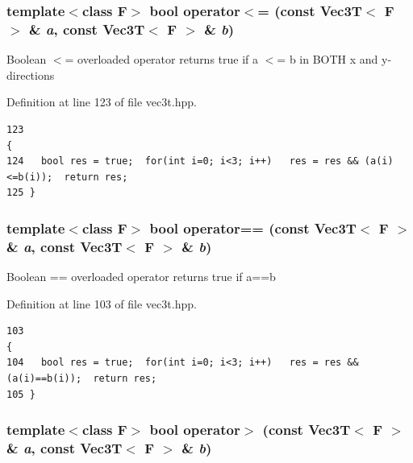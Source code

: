 \subsubsection{\setlength{\rightskip}{0pt plus 5cm}template$<$class F$>$ bool operator$<$= (const {\bf Vec3T}$<$ F $>$ \& {\em a}, const {\bf Vec3T}$<$ F $>$ \& {\em b})\hspace{0.3cm}{\tt  [inline]}}\label{vec3t_8hpp_8081c6ba62be3226321fbc37d23a8150_8081c6ba62be3226321fbc37d23a8150}


Boolean $<$= overloaded operator returns true if a $<$= b in BOTH x and y-directions 

Definition at line 123 of file vec3t.hpp.

\footnotesize\begin{verbatim}123                                                                                 {
124   bool res = true;  for(int i=0; i<3; i++)   res = res && (a(i)<=b(i));  return res; 
125 }
\end{verbatim}\normalsize 


\subsubsection{\setlength{\rightskip}{0pt plus 5cm}template$<$class F$>$ bool operator== (const {\bf Vec3T}$<$ F $>$ \& {\em a}, const {\bf Vec3T}$<$ F $>$ \& {\em b})\hspace{0.3cm}{\tt  [inline]}}\label{vec3t_8hpp_6f9fecc926d8fedfe340e2727fbf8c77_6f9fecc926d8fedfe340e2727fbf8c77}


Boolean == overloaded operator returns true if a==b 

Definition at line 103 of file vec3t.hpp.

\footnotesize\begin{verbatim}103                                                                                 {
104   bool res = true;  for(int i=0; i<3; i++)   res = res && (a(i)==b(i));  return res;
105 }
\end{verbatim}\normalsize 


\subsubsection{\setlength{\rightskip}{0pt plus 5cm}template$<$class F$>$ bool operator$>$ (const {\bf Vec3T}$<$ F $>$ \& {\em a}, const {\bf Vec3T}$<$ F $>$ \& {\em b})\hspace{0.3cm}{\tt  [inline]}}\label{vec3t_8hpp_53bf9873e7989ece9c30a5c526a34681_53bf9873e7989ece9c30a5c526a34681}


